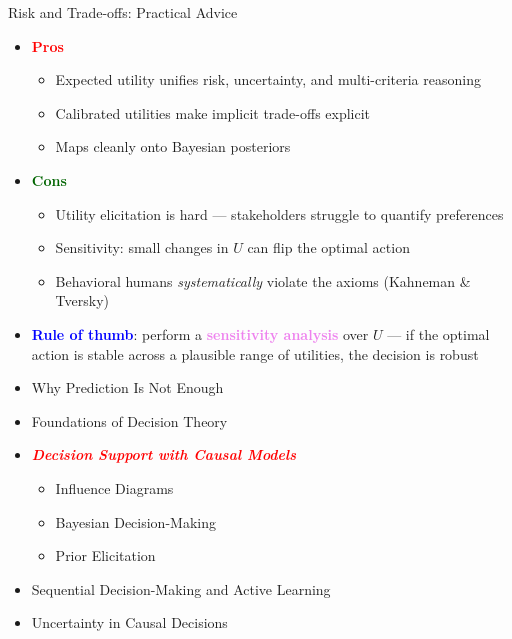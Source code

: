 \documentclass[
  10pt,
  ignorenonframetext,
]{beamer}
\providecommand{\tightlist}{%
  \setlength{\itemsep}{0pt}\setlength{\parskip}{0pt}}
\begin{document}
\begin{frame}{Risk and Trade-offs: Practical Advice}
\label{risk-and-trade-offs-practical-advice}
\begin{itemize}
\tightlist
\item
  \textbf{\textcolor{red}{Pros}}

  \begin{itemize}
  \tightlist
  \item
    Expected utility unifies risk, uncertainty, and multi-criteria
    reasoning
  \item
    Calibrated utilities make implicit trade-offs explicit
  \item
    Maps cleanly onto Bayesian posteriors
  \end{itemize}
\item
  \textbf{\textcolor{darkgreen}{Cons}}

  \begin{itemize}
  \tightlist
  \item
    Utility elicitation is hard --- stakeholders struggle to quantify
    preferences
  \item
    Sensitivity: small changes in \(U\) can flip the optimal action
  \item
    Behavioral humans \emph{systematically} violate the axioms (Kahneman
    \& Tversky)
  \end{itemize}
\item
  \textbf{\textcolor{blue}{Rule of thumb}}: perform a
  \textbf{\textcolor{violet}{sensitivity analysis}} over \(U\) --- if
  the optimal action is stable across a plausible range of utilities,
  the decision is robust
\end{itemize}
\end{frame}

\begin{frame}{}
\label{section-8}
\begin{itemize}
\tightlist
\item
  Why Prediction Is Not Enough
\item
  Foundations of Decision Theory
\item
  \emph{\textbf{\textcolor{red}{Decision Support with Causal Models}}}

  \begin{itemize}
  \tightlist
  \item
    Influence Diagrams
  \item
    Bayesian Decision-Making
  \item
    Prior Elicitation
  \end{itemize}
\item
  Sequential Decision-Making and Active Learning
\item
  Uncertainty in Causal Decisions
\end{itemize}
\end{frame}
\end{document}
